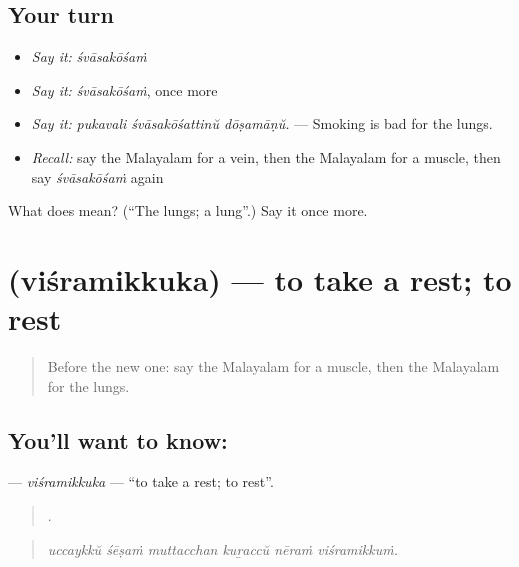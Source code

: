 \subsection*{Your turn}
\begin{itemize}
\raggedright
  \item \emph{Say it:} \emph{śvāsakōśaṁ}
  \item \emph{Say it:} \emph{śvāsakōśaṁ}, once more
  \item \emph{Say it:} \emph{pukavali śvāsakōśattinŭ dōṣamāṇŭ.} — Smoking is bad for the lungs.
  \item \emph{Recall:} say the Malayalam for a vein, then the Malayalam for a muscle, then say \emph{śvāsakōśaṁ} again
\end{itemize}

\begin{tcolorbox}[breakable,colback=teal!4,colframe=teal!35!black,title={Before you move on}]
What does  mean? (\textquotedblleft{}The lungs; a lung\textquotedblright{}.) Say it once more.
\end{tcolorbox}
\section[\texorpdfstring{\ml{വിശ്രമിക്കുക} (viśramikkuka)}{വിശ്രമിക്കുക (viśramikkuka)}]{ (viśramikkuka) — to take a rest; to rest}

\label{lesson:ML-C536-visramikkuka}



\begin{quote}
Before the new one: say the Malayalam for a muscle, then the Malayalam for the lungs.
\end{quote}

\subsection*{You'll want to know: }
\textbf{} — \emph{viśramikkuka} — \textquotedblleft{}to take a rest; to rest\textquotedblright{}.

\begin{quote}
     .
\end{quote}

\begin{quote}
\emph{uccaykkŭ śēṣaṁ muttacchan kuṟaccŭ nēraṁ viśramikkuṁ.}
\end{quote}

